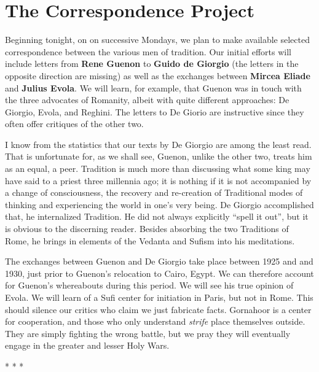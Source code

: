 \section{The Correspondence Project}

Beginning tonight, on on successive Mondays, we plan to make available selected correspondence between the various men of tradition. Our initial efforts will include letters from \textbf{Rene Guenon} to \textbf{Guido de Giorgio} (the letters in the opposite direction are missing) as well as the exchanges between \textbf{Mircea Eliade} and \textbf{Julius Evola}. We will learn, for example, that Guenon was in touch with the three advocates of Romanity, albeit with quite different approaches: De Giorgio, Evola, and Reghini. The letters to De Giorio are instructive since they often offer critiques of the other two.

I know from the statistics that our texts by De Giorgio are among the least read. That is unfortunate for, as we shall see, Guenon, unlike the other two, treats him as an equal, a peer. Tradition is much more than discussing what some king may have said to a priest three millennia ago; it is nothing if it is not accompanied by a change of consciousness, the recovery and re-creation of Traditional modes of thinking and experiencing the world in one's very being. De Giorgio accomplished that, he internalized Tradition. He did not always explicitly ``spell it out'', but it is obvious to the discerning reader. Besides absorbing the two Traditions of Rome, he brings in elements of the Vedanta and Sufism into his meditations.

The exchanges between Guenon and De Giorgio take place between 1925 and and 1930, just prior to Guenon's relocation to Cairo, Egypt. We can therefore account for Guenon's whereabouts during this period. We will see his true opinion of Evola. We will learn of a Sufi center for initiation in Paris, but not in Rome. This should silence our critics who claim we just fabricate facts. Gornahoor is a center for cooperation, and those who only understand \emph{strife} place themselves outside. They are simply fighting the wrong battle, but we pray they will eventually engage in the greater and lesser Holy Wars.



\begin{center}* * *\end{center}

